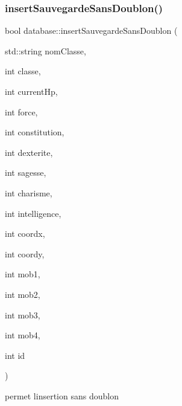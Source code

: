 \subsubsection{\texorpdfstring{insert\+Sauvegarde\+Sans\+Doublon()}{insertSauvegardeSansDoublon()}}
{\footnotesize\ttfamily bool database\+::insert\+Sauvegarde\+Sans\+Doublon (\begin{DoxyParamCaption}\item[{std\+::string}]{nom\+Classe,  }\item[{int}]{classe,  }\item[{int}]{current\+Hp,  }\item[{int}]{force,  }\item[{int}]{constitution,  }\item[{int}]{dexterite,  }\item[{int}]{sagesse,  }\item[{int}]{charisme,  }\item[{int}]{intelligence,  }\item[{int}]{coordx,  }\item[{int}]{coordy,  }\item[{int}]{mob1,  }\item[{int}]{mob2,  }\item[{int}]{mob3,  }\item[{int}]{mob4,  }\item[{int}]{id }\end{DoxyParamCaption})}



permet l\textquotesingle{}insertion sans doublon 

